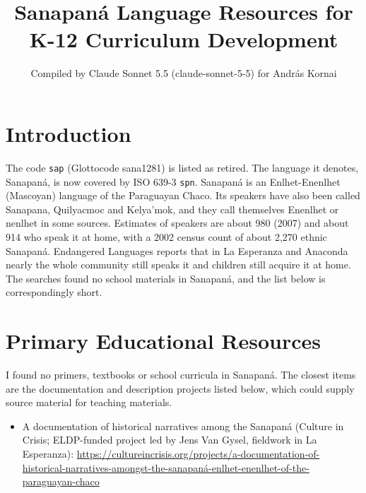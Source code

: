 \documentclass[12pt]{article}
\title{Sanapan\'a Language Resources for K-12 Curriculum Development}
\author{Compiled by Claude Sonnet 5.5 (claude-sonnet-5-5) for Andr\'as Kornai}
\date{}
\begin{document}
\maketitle

\section{Introduction}
The code \texttt{sap} (Glottocode sana1281) is listed as retired. The language it denotes, Sanapan\'a, is now covered by ISO 639-3 \texttt{spn}. Sanapan\'a is an Enlhet-Enenlhet (Mascoyan) language of the Paraguayan Chaco. Its speakers have also been called Sanapana, Quilyacmoc and Kelya'mok, and they call themselves Enenlhet or nenlhet in some sources. Estimates of speakers are about 980 (2007) and about 914 who speak it at home, with a 2002 census count of about 2,270 ethnic Sanapan\'a. Endangered Languages reports that in La Esperanza and Anaconda nearly the whole community still speaks it and children still acquire it at home. The searches found no school materials in Sanapan\'a, and the list below is correspondingly short.

\section{Primary Educational Resources}
I found no primers, textbooks or school curricula in Sanapan\'a. The closest items are the documentation and description projects listed below, which could supply source material for teaching materials.
\begin{itemize}
\item A documentation of historical narratives among the Sanapan\'a (Culture in Crisis; ELDP-funded project led by Jens Van Gysel, fieldwork in La Esperanza): \url{https://cultureincrisis.org/projects/a-documentation-of-historical-narratives-amongst-the-sanapaná-enlhet-enenlhet-of-the-paraguayan-chaco}
\end{itemize}
\end{document}
